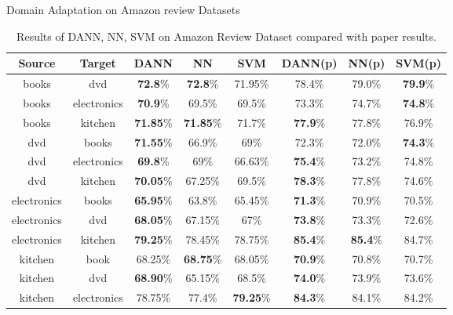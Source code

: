 \documentclass{beamer}
\begin{document}


\begin{frame}{Domain Adaptation on Amazon review Datasets}
    \begin{table}[h!]
    \centering
    \begin{adjustbox}{max width=\textwidth}
    \begin{tabular}{|c|c|c|c|c|c|c|c|}
    \hline
    Source & Target & DANN & NN & SVM & DANN(p) & NN(p) & SVM(p) \\ \hline
    books & dvd & \textbf{72.8}\% & \textbf{72.8}\% & 71.95\% & 78.4\% & 79.0\% & \textbf{79.9}\% \\ \hline
    books & electronics & \textbf{70.9}\% & 69.5\% & 69.5\% & 73.3\% & 74.7\% & \textbf{74.8}\% \\ \hline
    books & kitchen & \textbf{71.85}\% & \textbf{71.85}\% & 71.7\% & \textbf{77.9}\% & 77.8\% & 76.9\% \\ \hline
    dvd & books & \textbf{71.55}\% & 66.9\% & 69\% & 72.3\% & 72.0\% & \textbf{74.3}\% \\ \hline
    dvd & electronics & \textbf{69.8}\% & 69\% & 66.63\% & \textbf{75.4}\% & 73.2\% & 74.8\% \\ \hline
    dvd & kitchen & \textbf{70.05}\% & 67.25\% & 69.5\% & \textbf{78.3}\% & 77.8\% & 74.6\% \\ \hline
    electronics & books & \textbf{65.95}\% & 63.8\% & 65.45\% & \textbf{71.3}\% & 70.9\% & 70.5\% \\ \hline
    electronics & dvd & \textbf{68.05}\% & 67.15\% & 67\% & \textbf{73.8}\% & 73.3\% & 72.6\% \\ \hline
    electronics & kitchen & \textbf{79.25}\% & 78.45\% & 78.75\% & \textbf{85.4}\% & \textbf{85.4}\% & 84.7\% \\ \hline
    kitchen & book & 68.25\% & \textbf{68.75}\% & 68.05\% & \textbf{70.9}\% & 70.8\% & 70.7\% \\ \hline
    kitchen & dvd & \textbf{68.90}\% & 65.15\% & 68.5\% & \textbf{74.0}\% & 73.9\% & 73.6\% \\ \hline
    kitchen & electronics & 78.75\% & 77.4\% & \textbf{79.25}\% & \textbf{84.3}\% & 84.1\% & 84.2\% \\ \hline
    \end{tabular}
    \end{adjustbox}
    \caption{Results of DANN, NN, SVM on Amazon Review Dataset compared with paper results.}
    \label{tab:sample_table}
    \end{table}
        

\end{frame}
\end{document}
